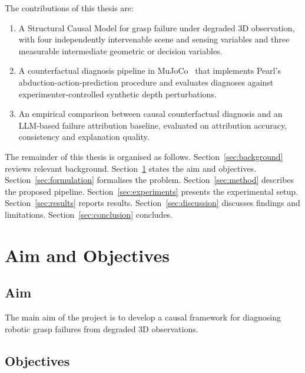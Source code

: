 \documentclass[journal]{IEEEtran}
\begin{document}
The contributions of this thesis are:
\begin{enumerate}
  \item A Structural Causal Model for grasp failure under degraded
        3D observation, with four independently intervenable scene
        and sensing variables and three measurable intermediate
        geometric or decision variables.
  \item A counterfactual diagnosis pipeline in MuJoCo~\cite{todorov2012mujoco}
        that implements Pearl's abduction-action-prediction procedure
        and evaluates diagnoses against experimenter-controlled
        synthetic depth perturbations.
  \item An empirical comparison between causal counterfactual
        diagnosis and an LLM-based failure attribution baseline,
        evaluated on attribution accuracy, consistency and explanation
        quality.
\end{enumerate}

The remainder of this thesis is organised as follows.
Section~\ref{sec:background} reviews relevant background.
Section~\ref{sec:aims} states the aim and objectives.
Section~\ref{sec:formulation} formalises the problem.
Section~\ref{sec:method} describes the proposed pipeline.
Section~\ref{sec:experiments} presents the experimental setup.
Section~\ref{sec:results} reports results.
Section~\ref{sec:discussion} discusses findings and limitations.
Section~\ref{sec:conclusion} concludes.

\section{Aim and Objectives}
\label{sec:aims}

\subsection*{Aim}

The main aim of the project is to develop a causal framework for
diagnosing robotic grasp failures from degraded 3D observations.

\subsection*{Objectives}
\end{document}
